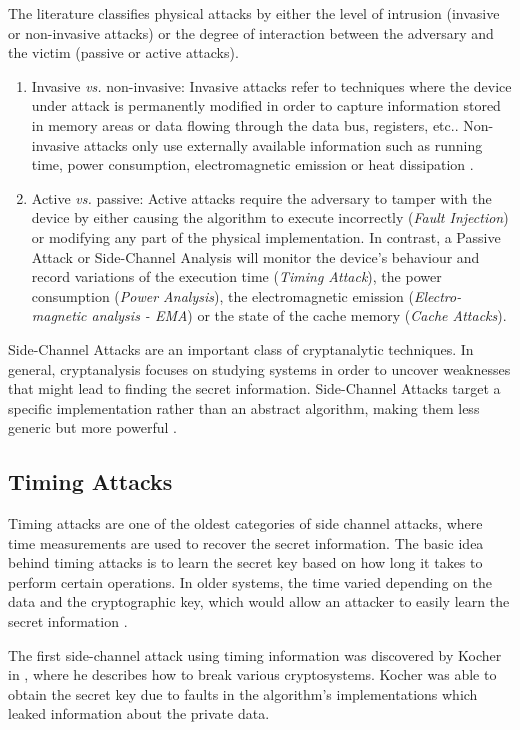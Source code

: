 \documentclass[10pt,a4paper,twoside]{book}
\begin{document}
The literature classifies physical attacks by either the level of intrusion (invasive or non-invasive attacks) or the degree of interaction between the adversary and the victim (passive or active attacks).
\begin{enumerate}
\item Invasive \textit{vs.} non-invasive: Invasive attacks refer to techniques where the device under attack is permanently modified in order to capture information stored in memory areas or data flowing through the data bus, registers, etc.\cite{Tria2011}. Non-invasive attacks only use externally available information such as running time, power consumption, electromagnetic emission or heat dissipation \cite{standaert2010introduction}.
\item Active \textit{vs.} passive: Active attacks require the adversary to tamper with the device by either causing the algorithm to execute incorrectly (\textit{Fault Injection}) or modifying any part of the physical implementation. In contrast, a Passive Attack or Side-Channel Analysis will monitor the device's behaviour and record variations of the execution time (\textit{Timing Attack}), the power consumption (\textit{Power Analysis}), the electromagnetic emission (\textit{Electro-magnetic analysis - EMA}) or the state of the cache memory (\textit{Cache Attacks}).
\end{enumerate}

Side-Channel Attacks are an important class of cryptanalytic techniques. In general, cryptanalysis focuses on studying systems in order to uncover weaknesses that might lead to finding the secret information. Side-Channel Attacks target a specific implementation rather than an abstract algorithm, making them less generic but more powerful \cite{standaert2010introduction}.

\subsection{Timing Attacks}

Timing attacks are one of the oldest categories of side channel attacks, where time measurements are used to recover the secret information. The basic idea behind timing attacks is to learn the secret key based on how long it takes to perform certain operations. In older systems, the time varied depending on the data and the cryptographic key, which would allow an attacker to easily learn the secret information \cite{Koeune2011}.

The first side-channel attack using timing information was discovered by Kocher in \cite{kocher1996timing}, where he describes how to break various cryptosystems. Kocher was able to obtain the secret key due to faults in the algorithm's implementations which leaked information about the private data.
\end{document}
